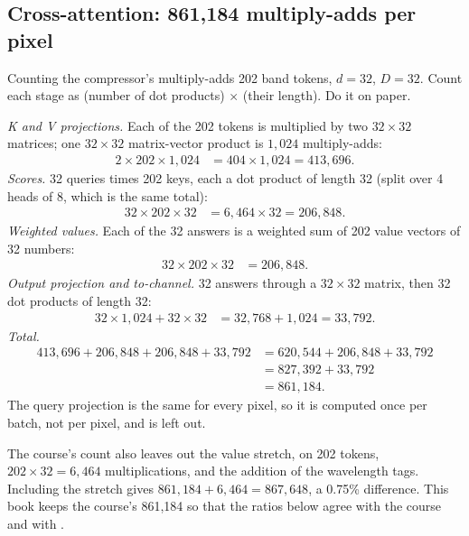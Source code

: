 \subsection{Cross-attention: 861,184 multiply-adds per pixel}

\begin{worked}[label={we:crossstem:macs}]{Counting the compressor's multiply-adds}
202 band tokens, $d = 32$, $D = 32$. Count each stage as (number of dot products) $\times$ (their length). Do it on paper.

\emph{K and V projections.} Each of the 202 tokens is multiplied by two $32\times32$ matrices; one $32\times32$ matrix-vector product is $1{,}024$ multiply-adds:
\begin{align*}
  2\times202\times1{,}024 &= 404\times1{,}024 = 413{,}696 .
\end{align*}
\emph{Scores.} 32 queries times 202 keys, each a dot product of length 32 (split over 4 heads of 8, which is the same total):
\begin{align*}
  32\times202\times32 &= 6{,}464\times32 = 206{,}848 .
\end{align*}
\emph{Weighted values.} Each of the 32 answers is a weighted sum of 202 value vectors of 32 numbers:
\begin{align*}
  32\times202\times32 &= 206{,}848 .
\end{align*}
\emph{Output projection and to-channel.} 32 answers through a $32\times32$ matrix, then 32 dot products of length 32:
\begin{align*}
  32\times1{,}024 + 32\times32 &= 32{,}768 + 1{,}024 = 33{,}792 .
\end{align*}
\emph{Total.}
\begin{align*}
  413{,}696 + 206{,}848 + 206{,}848 + 33{,}792 &= 620{,}544 + 206{,}848 + 33{,}792\\
  &= 827{,}392 + 33{,}792\\
  &= 861{,}184 .
\end{align*}
The query projection is the same for every pixel, so it is computed once per batch, not per pixel, and is left out.
\end{worked}

The course's count also leaves out the value stretch,  on 202 tokens, $202\times32 = 6{,}464$ multiplications, and the addition of the wavelength tags. Including the stretch gives $861{,}184 + 6{,}464 = 867{,}648$, a 0.75\% difference. This book keeps the course's 861,184 so that the ratios below agree with the course and with .

